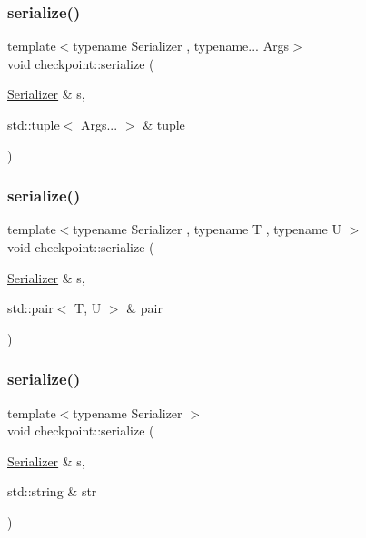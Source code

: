 \subsubsection{\texorpdfstring{serialize()}{serialize()}\hspace{0.1cm}{\footnotesize\ttfamily [10/25]}}
{\footnotesize\ttfamily template$<$typename Serializer , typename... Args$>$ \\
void checkpoint\+::serialize (\begin{DoxyParamCaption}\item[{\hyperlink{structcheckpoint_1_1_serializer}{Serializer} \&}]{s,  }\item[{std\+::tuple$<$ Args... $>$ \&}]{tuple }\end{DoxyParamCaption})}

\mbox{\label{namespacecheckpoint_a7b5c3ff67d3f7b65cfb46da7617e87ad}} 
\subsubsection{\texorpdfstring{serialize()}{serialize()}\hspace{0.1cm}{\footnotesize\ttfamily [11/25]}}
{\footnotesize\ttfamily template$<$typename Serializer , typename T , typename U $>$ \\
void checkpoint\+::serialize (\begin{DoxyParamCaption}\item[{\hyperlink{structcheckpoint_1_1_serializer}{Serializer} \&}]{s,  }\item[{std\+::pair$<$ T, U $>$ \&}]{pair }\end{DoxyParamCaption})}

\mbox{\label{namespacecheckpoint_aef8e8717e4cc129379525653730c4eba}} 
\subsubsection{\texorpdfstring{serialize()}{serialize()}\hspace{0.1cm}{\footnotesize\ttfamily [12/25]}}
{\footnotesize\ttfamily template$<$typename Serializer $>$ \\
void checkpoint\+::serialize (\begin{DoxyParamCaption}\item[{\hyperlink{structcheckpoint_1_1_serializer}{Serializer} \&}]{s,  }\item[{std\+::string \&}]{str }\end{DoxyParamCaption})}



